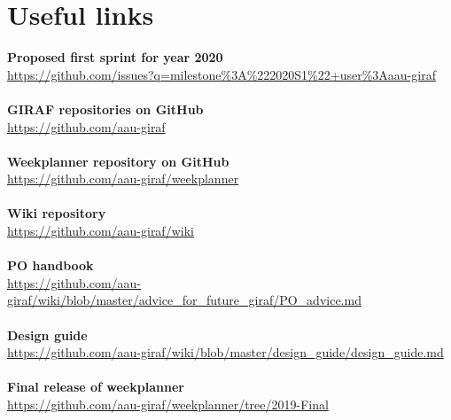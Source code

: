 \newpage
\chapter{Useful links}
\textbf{Proposed first sprint for year 2020} \\
\href{https://github.com/issues?q=milestone%3A%222020S1%22+user%3Aaau-giraf}{https://github.com/issues?q=milestone\%3A\%222020S1\%22+user\%3Aaau-giraf}
\\\\
\textbf{GIRAF repositories on GitHub} \\
\href{https://github.com/aau-giraf}{https://github.com/aau-giraf}
\\\\
\textbf{Weekplanner repository on GitHub} \\
\href{https://github.com/aau-giraf/weekplanner}{https://github.com/aau-giraf/weekplanner}
\\\\
\textbf{Wiki repository} \\
\href{https://github.com/aau-giraf/wiki}{https://github.com/aau-giraf/wiki}
\\\\
\textbf{PO handbook} \\
\href{https://github.com/aau-giraf/wiki/blob/master/advice_for_future_giraf/PO_advice.md}{https://github.com/aau-giraf/wiki/blob/master/advice_for_future_giraf/PO_advice.md}
\\\\
\textbf{Design guide} \\
\href{https://github.com/aau-giraf/wiki/blob/master/design_guide/design_guide.md}{https://github.com/aau-giraf/wiki/blob/master/design_guide/design_guide.md}
\\\\
\textbf{Final release of weekplanner} \\
\href{https://github.com/aau-giraf/weekplanner/tree/2019-Final}{https://github.com/aau-giraf/weekplanner/tree/2019-Final}
